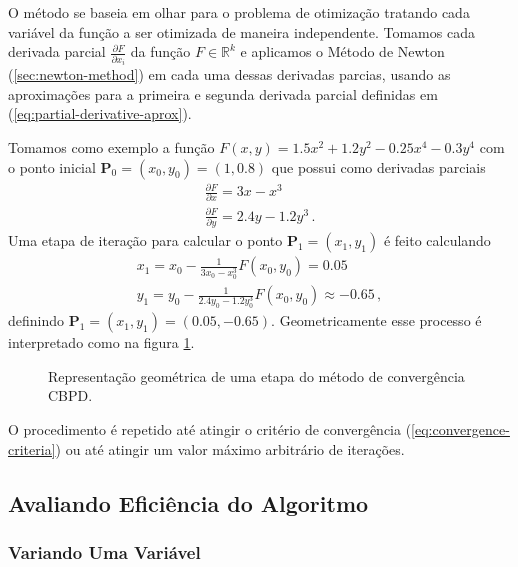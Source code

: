 O método se baseia em olhar para o problema de otimização tratando cada variável da função a ser otimizada de maneira independente. Tomamos cada derivada parcial $\frac{\partial F}{\partial x_i}$ da função $F \in \mathds{R}^k$ e aplicamos o Método de Newton (\ref{sec:newton-method}) em cada uma dessas derivadas parcias, usando as aproximações para a primeira e segunda derivada parcial definidas em (\ref{eq:partial-derivative-aprox}).

Tomamos como exemplo a função $F(x,y) = 1.5x^2 + 1.2y^2 - 0.25x^4 - 0.3y^4$ com o ponto inicial $\mathbf{P}_0 = (x_0,y_0) = (1, 0.8)$ que possui como derivadas parciais
%
\begin{equation}
  \begin{split}
    \frac{\partial F}{\partial x} = 3x - x^3 \\
    \frac{\partial F}{\partial y} = 2.4y - 1.2y^3 \,.
  \end{split}
\end{equation} 
%
Uma etapa de iteração para calcular o ponto $\mathbf{P}_1 = (x_1,y_1)$ é feito calculando
\begin{equation}
  \begin{split}
    x_1 = x_0 - \frac{1}{3x_0 - x_0^3} F(x_0, y_0) = 0.05\\
    y_1 = y_0 - \frac{1}{2.4y_0 - 1.2y_0^3} F(x_0, y_0) \approx -0.65 \,,
  \end{split}
\end{equation}
%
definindo $\mathbf{P}_1 = (x_1,y_1) = (0.05, -0.65)$. Geometricamente esse processo é interpretado como na figura \ref{fig:cbpd_geom_interp}.

\begin{figure}
  \begin{center}
    
  \end{center}
  \caption{Representação geométrica de uma etapa do método de convergência CBPD.}
  \label{fig:cbpd_geom_interp}
\end{figure}

O procedimento é repetido até atingir o critério de convergência (\ref{eq:convergence-criteria}) ou até atingir um valor máximo arbitrário de iterações.


\subsection{Avaliando Eficiência do Algoritmo}

\subsubsection{Variando Uma Variável}

